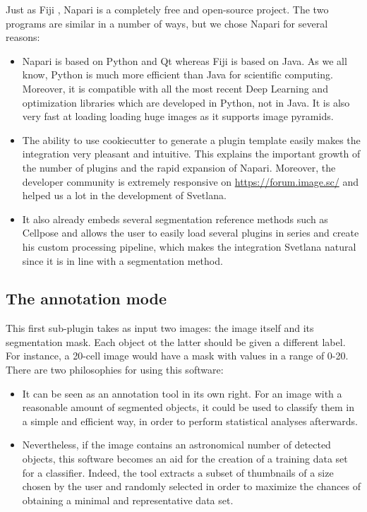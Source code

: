 \documentclass{article}
\begin{document}
Just as Fiji \cite{schindelin2012fiji}, Napari is a completely free and open-source project. The two programs are similar in a number of ways, but we chose Napari for several reasons:
\begin{itemize}
  \item Napari is based on Python and Qt whereas Fiji is based on Java. As we all know, Python is much more efficient than Java for scientific computing. Moreover, it is compatible with all the most recent Deep Learning and optimization libraries which are developed in Python, not in Java. It is also very fast at loading loading huge images as it supports image pyramids.
  \item The ability to use cookiecutter to generate a plugin template easily makes the integration very pleasant and intuitive. This explains the important growth of the number of plugins and the rapid expansion of Napari. Moreover, the developer community is extremely responsive on \url{https://forum.image.sc/} and helped us a lot in the development of Svetlana.
  \item It also already embeds several segmentation reference methods such as Cellpose \cite{stringer2021cellpose} and allows the user to easily load several plugins in series and create his custom processing pipeline, which makes the integration Svetlana natural since it is in line with a segmentation method.
\end{itemize}

\subsection{The annotation mode}

This first sub-plugin takes as input two images: the image itself and its segmentation mask. Each object ot the latter should be given a different label. For instance, a 20-cell image would have a mask with values in a range of 0-20.
\\
There are two philosophies for using this software:
\begin{itemize}
  \item It can be seen as an annotation tool in its own right. For an image with a reasonable amount of segmented objects, it could be used to classify them in a simple and efficient way, in order to perform statistical analyses afterwards.
  \item Nevertheless, if the image contains an astronomical number of detected objects, this software becomes an aid for the creation of a training data set for a classifier. Indeed, the tool extracts a subset of thumbnails of a size chosen by the user and randomly selected in order to maximize the chances of obtaining a minimal and representative data set. 
\end{itemize}
\end{document}
